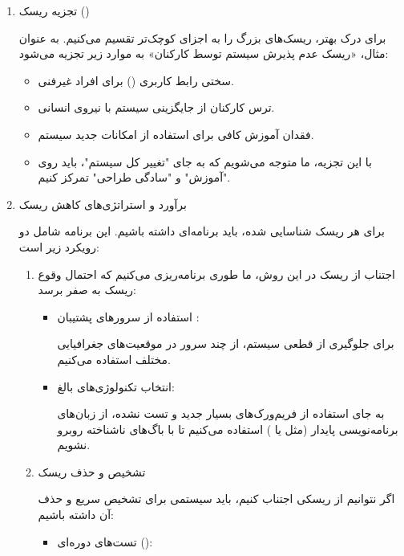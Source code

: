 \documentclass[12pt,a4paper]{report}
\begin{document}
\begin{enumerate}
\begin{itemize}
\begin{itemize}
اختلال در شبکه : از دست رفتن سیگنال در مناطق دورافتاده که منجر به توقف به‌روزرسانی لحظه‌ای مکان محموله می‌شود.
\item 
خطای ورود داده توسط پرسنل انبار: ثبت اشتباه وزن یا نوع کالا که منجر به تخصیص خودروی نامناسب می‌شود.
\item
تاخیر در ارسال به دلیل خرابی ناوگان: ریسک فیزیکی که مستقیماً بر اعتبار نرم‌افزار (در محاسبه زمان رسیدن) تاثیر می‌گذارد.
\end{itemize}
\end{itemize}
\item 
تجزیه ریسک ()

برای درک بهتر، ریسک‌های بزرگ را به اجزای کوچک‌تر تقسیم می‌کنیم. به عنوان مثال، «ریسک عدم پذیرش سیستم توسط کارکنان» به موارد زیر تجزیه می‌شود:
\begin{itemize}
	\item 
سختی رابط کاربری () برای افراد غیرفنی.
\item 
ترس کارکنان از جایگزینی سیستم با نیروی انسانی.
\item 
فقدان آموزش کافی برای استفاده از امکانات جدید سیستم.
\item
با این تجزیه، ما متوجه می‌شویم که به جای "تغییر کل سیستم"، باید روی "آموزش" و "سادگی طراحی" تمرکز کنیم.
\end{itemize}
\item 
 برآورد و استراتژی‌های کاهش ریسک
 
برای هر ریسک شناسایی شده، باید برنامه‌ای داشته باشیم. این برنامه شامل دو رویکرد زیر است:
\begin{enumerate}
	\item 
اجتناب از ریسک 
در این روش، ما طوری برنامه‌ریزی می‌کنیم که احتمال وقوع ریسک به صفر برسد:
\begin{itemize}
	\item 
استفاده از سرورهای پشتیبان :

 برای جلوگیری از قطعی سیستم، از چند سرور در موقعیت‌های جغرافیایی مختلف استفاده می‌کنیم.
\item 
انتخاب تکنولوژی‌های بالغ: 

به جای استفاده از فریم‌ورک‌های بسیار جدید و تست نشده، از زبان‌های برنامه‌نویسی پایدار (مثل  یا ) استفاده می‌کنیم تا با باگ‌های ناشناخته روبرو نشویم.
\end{itemize}
\item 
 تشخیص و حذف ریسک 
 
اگر نتوانیم از ریسکی اجتناب کنیم، باید سیستمی برای تشخیص سریع و حذف آن داشته باشیم:
\begin{itemize}
	\item 
تست‌های دوره‌ای ():


\end{itemize}
\end{enumerate}
\end{enumerate}
\end{document}

